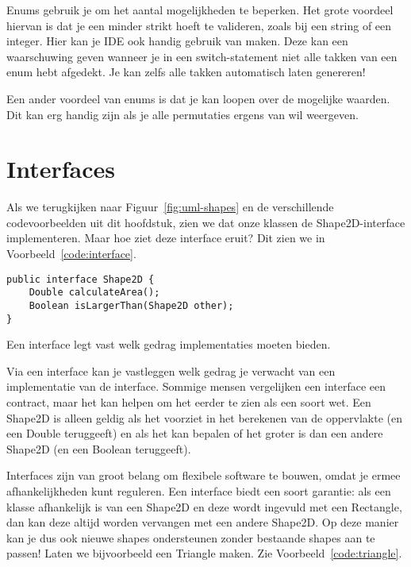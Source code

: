 Enums gebruik je om het aantal mogelijkheden te beperken. Het grote voordeel hiervan is dat je 
een minder strikt hoeft te valideren, zoals bij een string of een integer. Hier kan je IDE ook 
handig gebruik van maken. Deze kan een waarschuwing geven wanneer je in een switch-statement niet 
alle takken van een enum hebt afgedekt. Je kan zelfs alle takken automatisch laten genereren!

Een ander voordeel van enums is dat je kan loopen over de mogelijke waarden. Dit kan erg handig zijn 
als je alle permutaties ergens van wil weergeven.

\section{Interfaces}
Als we terugkijken naar Figuur~\ref{fig:uml-shapes} en de verschillende codevoorbeelden uit dit hoofdstuk,
zien we dat onze klassen de Shape2D-interface implementeren. Maar hoe ziet deze interface eruit?
Dit zien we in Voorbeeld~\ref{code:interface}.

\begin{listing}[H]
\begin{verbatim}
public interface Shape2D {
    Double calculateArea();
    Boolean isLargerThan(Shape2D other);
}
\end{verbatim}
\caption{Een interface legt vast welk gedrag implementaties moeten bieden.}
\label{code:interface}
\end{listing}

Via een interface kan je vastleggen welk gedrag je verwacht van een implementatie van
de interface. Sommige mensen vergelijken een interface een contract, maar het kan helpen 
om het eerder te zien als een soort wet. Een Shape2D is alleen geldig als het voorziet in 
het berekenen van de oppervlakte (en een Double teruggeeft) en als het kan bepalen of het 
groter is dan een andere Shape2D (en een Boolean teruggeeft).

Interfaces zijn van groot belang om flexibele software te bouwen, omdat je ermee afhankelijkheden 
kunt reguleren. Een interface biedt een soort garantie: als een klasse afhankelijk is van een 
Shape2D en deze wordt ingevuld met een Rectangle, dan kan deze altijd worden vervangen met een 
andere Shape2D. Op deze manier kan je dus ook nieuwe shapes ondersteunen zonder bestaande 
shapes aan te passen! Laten we bijvoorbeeld een Triangle maken. Zie Voorbeeld~\ref{code:triangle}.

